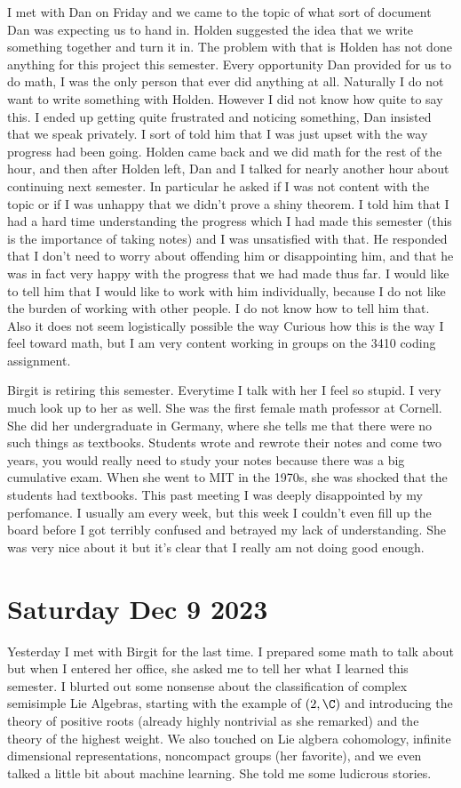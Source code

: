 \documentclass[12pt]{article}
\begin{document}
I met with Dan on Friday and we came to the topic of what sort of document Dan was expecting us to hand in. Holden suggested the idea that we write something together and turn it in.
The problem with that is Holden has not done anything for this project this semester. Every opportunity Dan provided for us to do math, I was the only person that ever did anything at all.
Naturally I do not want to write something with Holden. However I did not know how quite to say this. I ended up getting quite frustrated and noticing something, Dan insisted that we speak privately.
I sort of told him that I was just upset with the way progress had been going. Holden came back and we did math for the rest of the hour, and then after Holden left, Dan and I talked for nearly another hour
 about continuing next semester. In particular he asked if I was not content with the topic or if I was unhappy that we didn't prove a shiny theorem. I told him that I had a hard time understanding
 the progress which I had made this semester (this is the importance of taking notes) and I was unsatisfied with that. He responded that I don't need to worry about offending him or 
 disappointing him, and that he was in fact very happy with the progress that we had made thus far. I would like to tell him that I would like to work with him individually, because I do 
 not like the burden of working with other people. I do not know how to tell him that. Also it does not seem logistically possible the way
  Curious how this is the way I feel toward math, but I am very content working in groups on the 3410 coding assignment.

  \hfill

Birgit is retiring this semester. Everytime I talk with her I feel so stupid. I very much look up to her as well. She was the first female math professor at Cornell. She did her 
undergraduate in Germany, where she tells me that there were no such things as textbooks. Students wrote and rewrote their notes and come two years,
you would really need to study your notes because there was a big cumulative exam. When she went to MIT in the 1970s, she was shocked that the students had textbooks.
This past meeting I was deeply disappointed by my perfomance. I usually am every week, but this week I couldn't even fill up the board before I got terribly confused and betrayed 
my lack of understanding. She was very nice about it but it's clear that I really am not doing good enough.
\section{Saturday Dec 9 2023}
Yesterday I met with Birgit for the last time. I prepared some math to talk about but when I entered her office, she asked me to tell her what I learned this semester. I blurted out
some nonsense about the classification of complex semisimple Lie Algebras, starting with the example of $\sl(2,\C)$ and introducing the theory of positive roots (already highly nontrivial as she remarked)
and the theory of the highest weight. We also touched on Lie algbera cohomology, infinite dimensional representations, noncompact groups (her favorite), and we even talked 
a little bit about machine learning. She told me some ludicrous stories.
\end{document}
